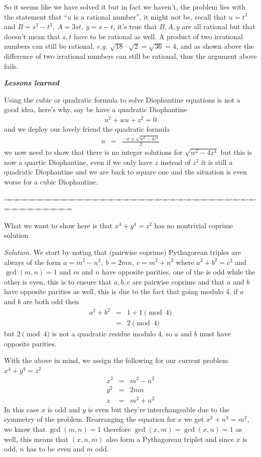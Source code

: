 \documentclass[aps,preprint,preprintnumbers,nofootinbib,showpacs,prd]{revtex4-1}
\newcommand{\eg}{{\it e.g.} }
\newcommand{\nbea}{\begin{eqnarray*}}
\newcommand{\neea}{\end{eqnarray*}}
\begin{document}
So it seems like we have solved it but in fact we haven't, the problem lies with the statement that ``$u$ is a rational number'', it might not be, recall that $u = t^3$ and $B = s^3 - t^3,~A=3st,~y = s-t$, it's true that $B, A, y$ are all rational but that doesn't mean that $s,t$ have to be rational as well. A product of two irrational numbers can still be rational, \eg $\sqrt{18}\cdot\sqrt{2} = \sqrt{36} = 4$, and as shown above the difference of two irrational numbers can still be rational, thus the argument above fails.

\bigskip
\textit{\textbf{Lessons learned}}
\smallskip

Using the cubic or quadratic formula to solve Diophantine equations is not a good idea, here's why, say be have a quadratic Diophantine
%
\nbea
u^2 + wu + z^2 = 0
\neea
%
and we deploy our lovely friend the quadratic formula
%
\nbea
u & = & \frac{-w \pm \sqrt{w^2 - 4z^4}}{2}
\neea
%
we now need to show that there is no integer solutions for  $\sqrt{w^2 - 4z^4}$ but this is now a quartic Diophantine, even if we only have $z$ instead of $z^2$ it is still a quadratic Diophantine and we are back to square one and the situation is even worse for a cubic Diophantine.




-=-=-=-=-=-=-=-=-=-=-=-=-=-=-=-=-=-=-=-=-=-=-=-=-=-=-=-=-=-=-=-=-=-=-=-=-=-=-=-=-=


What we want to show here is that $x^4 + y^4 = z^2$ has no nontrivial coprime solution

{\it Solution}. We start by noting that (pairwise coprime) Pythagorean triples are always of the form $a=m^2-n^2,~b = 2mn,~c = m^2 + n^2$ where $a^2 + b^2 = c^2$ and $\gcd(m,n)=1$ and $m$ and $n$ have opposite parities, one of the is odd while the other is even, this is to ensure that $a,b,c$ are pairwise coprime and that $a$ and $b$ have opposite parities as well, this is due to the fact that going modulo 4, if $a$ and $b$ are both odd then
%
\nbea
a^2 + b^2 & = & 1 + 1 \pmod{4} \\
& = & 2 \pmod{4}
\neea
%
but $2 \pmod{4}$ is not a quadratic residue modulo 4, so $a$ and $b$ must have opposite parities.

With the above in mind, we assign the following for our current problem $x^4 + y^4 = z^2$
%
\nbea
x^2 & = & m^2 - n^2 \\
y^2 & = & 2mn \\
z & = & m^2 + n^2
\neea
%
In this case $x$ is odd and $y$ is even but they're interchangeable due to the symmetry of the problem. Rearranging the equation for $x$ we get $x^2 + n^2 = m^2$, we know that $\gcd(m,n) = 1$ therefore $\gcd(x,m) = \gcd(x,n) = 1$ as well, this means that $(x,n,m)$ also form a Pythagorean triplet and since $x$ is odd, $n$ has to be even and $m$ odd.
\end{document}
